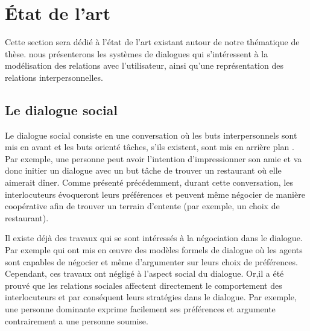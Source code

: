 \documentclass[a4paper,french]{article}
\begin{document}
\section{État de l'art}
\label{RW}
Cette section sera dédié à l'état de l'art existant autour de notre thématique de thèse. nous présenterons les systèmes de dialogues qui s'intéressent à la modélisation des relations avec l'utilisateur, ainsi qu'une représentation des relations interpersonnelles.  

\subsection{Le dialogue social}
\par Le dialogue social consiste en une conversation où les buts interpersonnels sont mis en avant et les buts orienté tâches, s'ils existent, sont mis en arrière plan \cite{bickmore2005social}. Par exemple, une personne peut avoir l'intention d'impressionner son amie et va donc initier un dialogue avec un but  tâche de trouver un restaurant où elle aimerait dîner. Comme présenté précédemment, durant cette conversation, les interlocuteurs évoqueront leurs préférences et peuvent même négocier de manière coopérative afin de trouver un terrain d'entente (par exemple, un choix de restaurant).  



\par Il existe déjà  des travaux qui se sont intéressés à la négociation  dans le dialogue. Par exemple \cite{amgoud2000arguments, daskalopulu1998handling} qui ont mis en œuvre des modèles formels de dialogue où les agents sont capables de négocier et même d'argumenter sur leurs choix de préférences. Cependant, ces travaux ont négligé à l'aspect social du dialogue. Or,il a été prouvé que les relations sociales affectent directement le comportement des interlocuteurs \cite{bickmore2000weather, bickmore2005establishing, moon1998intimate, nass2000does} et par conséquent leurs stratégies dans le dialogue. Par exemple, une personne dominante exprime facilement ses préférences et argumente contrairement a une personne soumise. 
\end{document}
